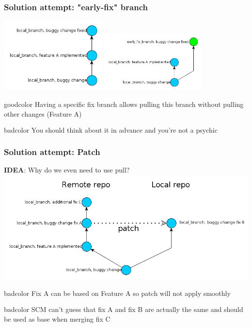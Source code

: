 \documentclass{beamer}
\begin{document}
\begin{frame}
\frametitle{Solution attempt: "early-fix" branch}
\begin{multicols}{2}
\includegraphics[width=0.4\textwidth]{img/early_fix_branch_bad}
\columnbreak
{}
\includegraphics[width=0.4\textwidth]{img/early_fix_branch_good}
\end{multicols}
\begin{beamercolorbox}[rounded=true,center,shadow=true]{goodcolor}
  Having a specific fix branch allows pulling this branch without pulling other changes (Feature A)
\end{beamercolorbox}
\begin{beamercolorbox}[rounded=true,center,shadow=true]{badcolor}
  You should think about it in advance and you're not a psychic
\end{beamercolorbox}
\end{frame}

\begin{frame}
\frametitle{Solution attempt: Patch}
\textbf{IDEA}: Why do we even need to use pull?
\includegraphics[width=\textwidth]{img/using_patch}

\begin{beamercolorbox}[rounded=true,center,shadow=true]{badcolor}
  Fix A can be based on Feature A so patch will not apply smoothly
\end{beamercolorbox}
\begin{beamercolorbox}[rounded=true,center,shadow=true]{badcolor}
  SCM can't guess that fix A and fix B are actually the same and should be used as base when merging fix C
\end{beamercolorbox}
\end{frame}
\end{document}
